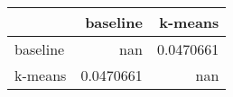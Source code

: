 \begin{tabular}{lrr}
\toprule
          &    baseline &     k-means \\
\midrule
 baseline & nan         &   0.0470661 \\
 k-means  &   0.0470661 & nan         \\
\bottomrule
\end{tabular}